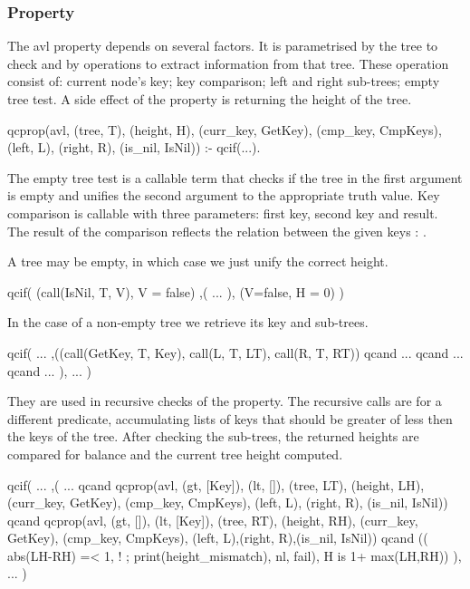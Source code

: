 \subsubsection*{Property}

The avl property depends on several factors.
%
It is parametrised by the tree to check and by operations to extract
information from that tree.
%
These operation consist of: current node's key; key comparison; left and
right sub-trees; empty tree test.
%
A side effect of the property is returning the height of the tree.
%
\begin{yapcode}
 qcprop({avl, (tree, T), (height, H),
      (curr_key, GetKey), (cmp_key, CmpKeys),
      (left, L), (right, R),
      (is_nil, IsNil)}) :- 
   qcif(...).
\end{yapcode}
%
The empty tree test is a callable term that checks if the tree in the
first argument is empty and unifies the second argument to the
appropriate truth value.
%
Key comparison is callable with three parameters: first key, second key
and result.
%
The result of the comparison reflects the relation between the given
keys : .


A tree may be empty, in which case we just unify the correct height.
\begin{yapcode}
   qcif( (call(IsNil, T, V), V = false)
   ,(
     ...
   ),
   (V=false, H = 0) )
\end{yapcode}
%
In the case of a non-empty tree we retrieve its key and sub-trees.
%
\begin{yapcode}
   qcif( ...
   ,((call(GetKey, T, Key),
       call(L, T, LT),  call(R, T, RT))
   qcand
     ...
   qcand
     ...
   qcand
     ...
   ),
     ... )
\end{yapcode}
%
They are used in recursive checks of the property.
%
The recursive calls are for a different predicate, accumulating lists of
keys that should be greater of less then the keys of the tree.
%
After checking the sub-trees, the returned heights are compared for
balance and the current tree height computed.
%
\begin{yapcode}
   qcif( ...
   ,( ...
   qcand
     qcprop({avl, (gt, [Key]), (lt, []),
 (tree, LT), (height, LH),
 (curr_key, GetKey), (cmp_key, CmpKeys),
 (left, L), (right, R), (is_nil, IsNil)})
   qcand
     qcprop({avl, (gt, []), (lt, [Key]),
 (tree, RT), (height, RH),
 (curr_key, GetKey), (cmp_key, CmpKeys),
 (left, L),(right, R),(is_nil, IsNil)})
   qcand
     (( abs(LH-RH) =< 1, !
     ; print(height_mismatch), nl, fail),
     H is 1+ max(LH,RH))
   ),
     ... )
\end{yapcode}


